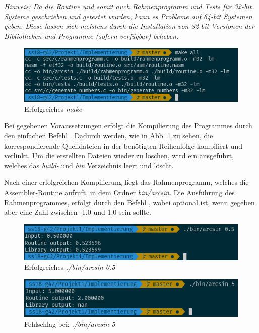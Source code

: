 \documentclass{article}
\begin{document}
	\emph{Hinweis: Da die Routine und somit auch Rahmenprogramm und Tests für 32-bit
	Systeme geschrieben und getestet wurden, kann es Probleme auf 64-bit Systemen geben.
	Diese lassen sich meistens durch die Installation von 32-bit-Versionen der
	Bibliotheken und Programme (sofern verfügbar) beheben.}

	\begin{figure}[hb]
		\centering
		\includegraphics[width=0.7\linewidth]{images/makeshot}
		\caption{Erfolgreiches \emph{make}}
		\label{fig:screenshotmake}
	\end{figure}

	Bei gegebenen Voraussetzungen erfolgt die Kompilierung des
	Programmes durch den einfachen Befehl .
	Dadurch werden, wie in Abb. \ref{fig:screenshotmake} zu sehen,
	die korrespondierende Quelldateien in der
	benötigten Reihenfolge kompiliert und verlinkt.
	Um die erstellten Dateien wieder zu löschen, wird ein 
	ausgeführt, welches das \emph{build-} und \emph{bin} Verzeichnis leert und löscht.

	Nach einer erfolgreichen Kompilierung liegt das Rahmenprogramm,
	welches die Assembler-Routine aufruft,
	 in dem Ordner \emph{bin/arcsin}.
	 Die Ausführung des Rahmenprogrammes, erfolgt durch den Befehl
	, wobei \codeword{[number]} optional ist,
	wenn gegeben aber eine Zahl zwischen -1.0 und 1.0 sein sollte.
	\begin{figure}[hb]
		\centering
		\includegraphics[width=0.7\linewidth]{images/arcsucc}
		\caption{Erfolgreiches \emph{./bin/arcsin 0.5}}
		\label{fig:arcsucc}
	\end{figure}
	\begin{figure}[htb]
		\centering
		\includegraphics[width=0.7\linewidth]{images/arcfail}
		\caption{Fehlschlag bei: \emph{./bin/arcsin 5}}
		\label{fig:arcfail}
	\end{figure}
\end{document}
